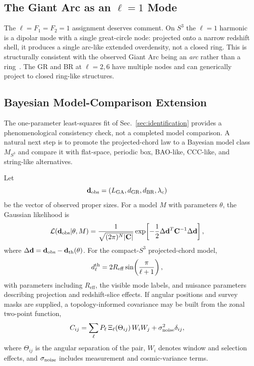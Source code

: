 \documentclass[
  aps,
  prd,
  reprint,
  superscriptaddress,
  nofootinbib,
  longbibliography,
  floatfix,
  amsmath,
  amssymb
]{revtex4-2}
\theoremstyle{plain}
\theoremstyle{definition}
\theoremstyle{remark}
\newcommand{\Sthree}{S^3}
\newcommand{\Reff}{R_{\mathrm{eff}}}
\begin{document}
\subsection{The Giant Arc as an $\ell=1$ Mode}

The $\ell=F_1=F_2=1$ assignment deserves comment. On $\Sthree$ the
$\ell=1$ harmonic is a dipolar mode with a single great-circle node:
projected onto a narrow redshift shell, it produces a single
arc-like extended overdensity, not a closed ring. This is
structurally consistent with the observed Giant Arc being an
\emph{arc} rather than a ring~\cite{Lopez2022}. The GR and BR at
$\ell=2,6$ have multiple nodes and can generically project to closed
ring-like structures.



\subsection{Bayesian Model-Comparison Extension}
\label{subsec:bayes-extension}

The one-parameter least-squares fit of Sec.~\ref{sec:identification}
provides a phenomenological consistency check, not a completed model
comparison. A natural next step is to promote the projected-chord law to
a Bayesian model class $M_{S^3}$ and compare it with flat-space, periodic
box, BAO-like, CCC-like, and string-like alternatives.

Let
\begin{equation}
  \mathbf d_{\rm obs}=(L_{\rm GA},d_{\rm GR},d_{\rm BR},\lambda_c)
\end{equation}
be the vector of observed proper sizes. For a model $M$ with parameters
$\theta$, the Gaussian likelihood is
\begin{equation}
\mathcal L(\mathbf d_{\rm obs}|\theta,M)=
\frac{1}{\sqrt{(2\pi)^N|\mathbf C|}}
\exp\!\left[-\frac12\Delta\mathbf d^{T}\mathbf C^{-1}\Delta\mathbf d\right],
\label{eq:likelihood}
\end{equation}
where $\Delta\mathbf d=\mathbf d_{\rm obs}-\mathbf d_{\rm th}(\theta)$.
For the compact-$S^3$ projected-chord model,
\begin{equation}
  d_{\ell}^{\rm th}=2\Reff\sin\!\left(\frac{\pi}{\ell+1}\right),
  \label{eq:chord-bayes}
\end{equation}
with parameters including $\Reff$, the visible mode labels, and nuisance
parameters describing projection and redshift-slice effects. If angular
positions and survey masks are supplied, a topology-informed covariance
may be built from the zonal two-point function,
\begin{equation}
  C_{ij}=\sum_{\ell}P_\ell\,\Xi_\ell(\Theta_{ij})\,W_iW_j
  +\sigma_{\rm noise}^2\delta_{ij},
  \label{eq:covariance}
\end{equation}
where $\Theta_{ij}$ is the angular separation of the pair, $W_i$ denotes
window and selection effects, and $\sigma_{\rm noise}$ includes
measurement and cosmic-variance terms.
\end{document}
